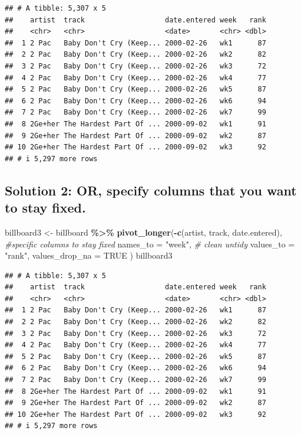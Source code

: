 \documentclass[
]{article}
\newenvironment{Shaded}{\begin{snugshade}}{\end{snugshade}}
\newcommand{\AttributeTok}[1]{\textcolor[rgb]{0.13,0.29,0.53}{#1}}
\newcommand{\CommentTok}[1]{\textcolor[rgb]{0.56,0.35,0.01}{\textit{#1}}}
\newcommand{\ConstantTok}[1]{\textcolor[rgb]{0.56,0.35,0.01}{#1}}
\newcommand{\FunctionTok}[1]{\textcolor[rgb]{0.13,0.29,0.53}{\textbf{#1}}}
\newcommand{\NormalTok}[1]{#1}
\newcommand{\OtherTok}[1]{\textcolor[rgb]{0.56,0.35,0.01}{#1}}
\newcommand{\SpecialCharTok}[1]{\textcolor[rgb]{0.81,0.36,0.00}{\textbf{#1}}}
\newcommand{\StringTok}[1]{\textcolor[rgb]{0.31,0.60,0.02}{#1}}
\begin{document}
\begin{verbatim}
## # A tibble: 5,307 x 5
##    artist  track                   date.entered week   rank
##    <chr>   <chr>                   <date>       <chr> <dbl>
##  1 2 Pac   Baby Don't Cry (Keep... 2000-02-26   wk1      87
##  2 2 Pac   Baby Don't Cry (Keep... 2000-02-26   wk2      82
##  3 2 Pac   Baby Don't Cry (Keep... 2000-02-26   wk3      72
##  4 2 Pac   Baby Don't Cry (Keep... 2000-02-26   wk4      77
##  5 2 Pac   Baby Don't Cry (Keep... 2000-02-26   wk5      87
##  6 2 Pac   Baby Don't Cry (Keep... 2000-02-26   wk6      94
##  7 2 Pac   Baby Don't Cry (Keep... 2000-02-26   wk7      99
##  8 2Ge+her The Hardest Part Of ... 2000-09-02   wk1      91
##  9 2Ge+her The Hardest Part Of ... 2000-09-02   wk2      87
## 10 2Ge+her The Hardest Part Of ... 2000-09-02   wk3      92
## # i 5,297 more rows
\end{verbatim}

\hypertarget{solution-2-or-specify-columns-that-you-want-to-stay-fixed.}{%
\subsection{Solution 2: OR, specify columns that you want to stay
fixed.}\label{solution-2-or-specify-columns-that-you-want-to-stay-fixed.}}

\begin{Shaded}
\begin{Highlighting}[]
\NormalTok{billboard3 }\OtherTok{\textless{}{-}} 
\NormalTok{  billboard }\SpecialCharTok{\%\textgreater{}\%} 
  \FunctionTok{pivot\_longer}\NormalTok{(}\SpecialCharTok{{-}}\FunctionTok{c}\NormalTok{(artist, track, date.entered), }\CommentTok{\#specific columns to stay fixed}
               \AttributeTok{names\_to =} \StringTok{"week"}\NormalTok{, }\CommentTok{\# clean untidy}
               \AttributeTok{values\_to =} \StringTok{"rank"}\NormalTok{,}
               \AttributeTok{values\_drop\_na =} \ConstantTok{TRUE}
\NormalTok{               )}
\NormalTok{billboard3}
\end{Highlighting}
\end{Shaded}

\begin{verbatim}
## # A tibble: 5,307 x 5
##    artist  track                   date.entered week   rank
##    <chr>   <chr>                   <date>       <chr> <dbl>
##  1 2 Pac   Baby Don't Cry (Keep... 2000-02-26   wk1      87
##  2 2 Pac   Baby Don't Cry (Keep... 2000-02-26   wk2      82
##  3 2 Pac   Baby Don't Cry (Keep... 2000-02-26   wk3      72
##  4 2 Pac   Baby Don't Cry (Keep... 2000-02-26   wk4      77
##  5 2 Pac   Baby Don't Cry (Keep... 2000-02-26   wk5      87
##  6 2 Pac   Baby Don't Cry (Keep... 2000-02-26   wk6      94
##  7 2 Pac   Baby Don't Cry (Keep... 2000-02-26   wk7      99
##  8 2Ge+her The Hardest Part Of ... 2000-09-02   wk1      91
##  9 2Ge+her The Hardest Part Of ... 2000-09-02   wk2      87
## 10 2Ge+her The Hardest Part Of ... 2000-09-02   wk3      92
## # i 5,297 more rows
\end{verbatim}
\end{document}
